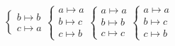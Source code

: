 \begin{enumerate}[label=\arabic*.,ref=\thesubsection.\theenumi]
\begin{align}
\begin{cases}
b\mapsto b\\
c\mapsto a
\end{cases}
\begin{cases}
a\mapsto a\\
b\mapsto c\\
c\mapsto b
\end{cases}
\begin{cases}
a\mapsto a\\
b\mapsto b\\
c\mapsto c
\end{cases}
\begin{cases}
a\mapsto a\\
b\mapsto c\\
c\mapsto b
\end{cases}
	\end{align}
\end{enumerate}

